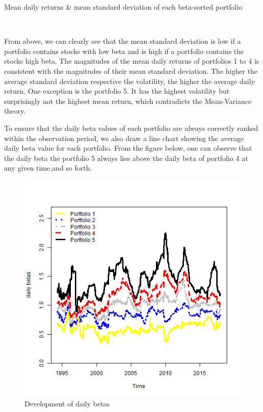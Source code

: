 \documentclass[12pt,a4paper,abstracton,fleqn]{article}
\begin{document}
\makeatletter{}\makeatother
\centering
{}
\caption{Mean daily returns \& mean standard deviation of each beta-sorted portfolio}
\label{tab:my-table}

~\\
\begin{justify}
From above, we can clearly see that the mean standard deviation is low if a portfolio contains stocks with low beta and is high if a portfolio contains the stocks high beta. The magnitudes of the mean daily returns of portfolios 1 to 4 is consistent with the magnitudes of their mean standard deviation. The higher the average standard deviation respective the volatility, the higher the average daily return. One exception is the portfolio 5. It has the highest volatility but surprisingly not the highest mean return, which contradicts the Mean-Variance theory.

To ensure that the daily beta values of each portfolio are always correctly ranked within the observation period, we also draw a line chart showing the average daily beta value for each portfolio. From the figure below, one can observe that the daily beta the portfolio 5 always lies above the daily beta of portfolio 4 at any given time,and so forth.

\begin{figure}[H]
\centering
\includegraphics[scale=0.8]{daily betas}
\caption{Development of daily betas}
\label{fig:Development of daily betas}
\end{figure}


\end{justify}
\end{document}
